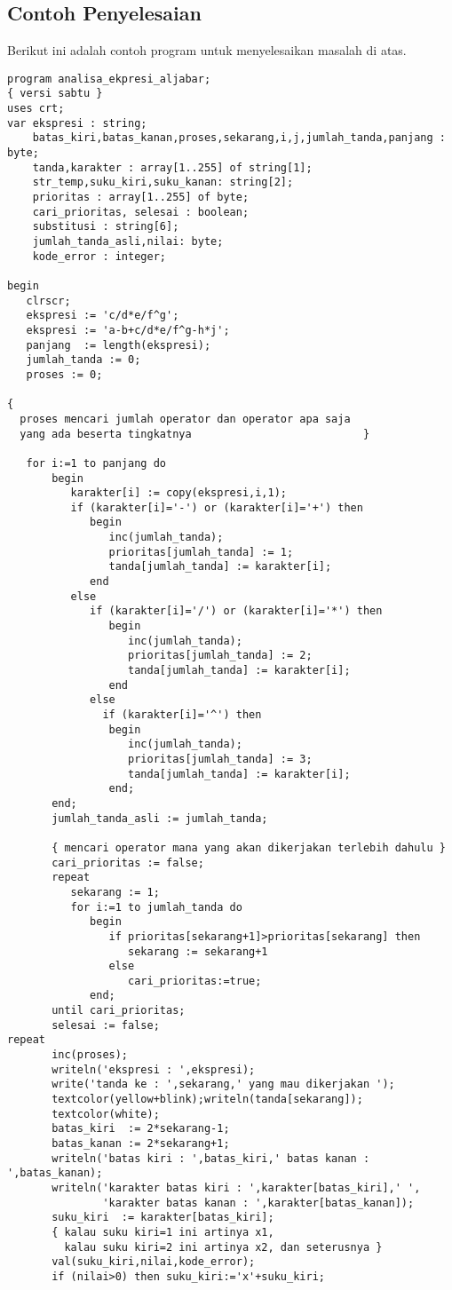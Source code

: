 \documentclass[a4paper,10pt,makeidx]{article}
\begin{document}
\subsection{Contoh Penyelesaian}
\par
\indent
\indent
Berikut ini adalah contoh program untuk menyelesaikan masalah di atas.
\begin{verbatim}
program analisa_ekpresi_aljabar;
{ versi sabtu }
uses crt;
var ekspresi : string;
    batas_kiri,batas_kanan,proses,sekarang,i,j,jumlah_tanda,panjang : byte;
    tanda,karakter : array[1..255] of string[1];
    str_temp,suku_kiri,suku_kanan: string[2];
    prioritas : array[1..255] of byte;
    cari_prioritas, selesai : boolean;
    substitusi : string[6];
    jumlah_tanda_asli,nilai: byte;
    kode_error : integer;

begin
   clrscr;
   ekspresi := 'c/d*e/f^g';
   ekspresi := 'a-b+c/d*e/f^g-h*j';
   panjang  := length(ekspresi);
   jumlah_tanda := 0;
   proses := 0;

{
  proses mencari jumlah operator dan operator apa saja
  yang ada beserta tingkatnya                           }

   for i:=1 to panjang do
       begin
          karakter[i] := copy(ekspresi,i,1);
          if (karakter[i]='-') or (karakter[i]='+') then
             begin
                inc(jumlah_tanda);
                prioritas[jumlah_tanda] := 1;
                tanda[jumlah_tanda] := karakter[i];
             end
          else
             if (karakter[i]='/') or (karakter[i]='*') then
                begin
                   inc(jumlah_tanda);
                   prioritas[jumlah_tanda] := 2;
                   tanda[jumlah_tanda] := karakter[i];
                end
             else
               if (karakter[i]='^') then
                begin
                   inc(jumlah_tanda);
                   prioritas[jumlah_tanda] := 3;
                   tanda[jumlah_tanda] := karakter[i];
                end;
       end;
       jumlah_tanda_asli := jumlah_tanda;

       { mencari operator mana yang akan dikerjakan terlebih dahulu }
       cari_prioritas := false;
       repeat
          sekarang := 1;
          for i:=1 to jumlah_tanda do
             begin
                if prioritas[sekarang+1]>prioritas[sekarang] then
                   sekarang := sekarang+1
                else
                   cari_prioritas:=true;
             end;
       until cari_prioritas;
       selesai := false;
repeat
       inc(proses);
       writeln('ekspresi : ',ekspresi);
       write('tanda ke : ',sekarang,' yang mau dikerjakan ');
       textcolor(yellow+blink);writeln(tanda[sekarang]);
       textcolor(white);
       batas_kiri  := 2*sekarang-1;
       batas_kanan := 2*sekarang+1;
       writeln('batas kiri : ',batas_kiri,' batas kanan : ',batas_kanan);
       writeln('karakter batas kiri : ',karakter[batas_kiri],' ',
               'karakter batas kanan : ',karakter[batas_kanan]);
       suku_kiri  := karakter[batas_kiri];
       { kalau suku kiri=1 ini artinya x1,
         kalau suku kiri=2 ini artinya x2, dan seterusnya }
       val(suku_kiri,nilai,kode_error);
       if (nilai>0) then suku_kiri:='x'+suku_kiri;


\end{verbatim}
\end{document}
